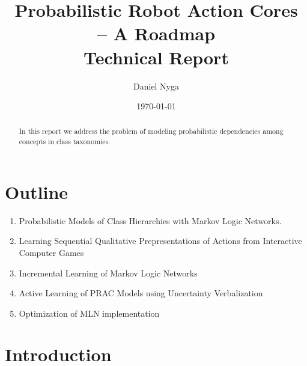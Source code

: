 \documentclass[12pt,a4paper]{article}
\title{\textbf{Probabilistic Robot Action Cores\\-- A Roadmap}\\\vspace{.5cm} {\Large Technical Report}}
\author{Daniel Nyga}
\date{\today}
\begin{document}
\maketitle	

\begin{abstract}
In this report we address the problem of modeling probabilistic dependencies among
concepts in class taxonomies. 
\end{abstract}

\section{Outline}

\begin{enumerate}
	\item Probabilistic Models of Class Hierarchies with Markov Logic Networks.
	\item Learning Sequential Qualitative Prepresentations of Actions from Interactive Computer Games
	\item Incremental Learning of Markov Logic Networks
	\item Active Learning of PRAC Models using Uncertainty Verbalization
	\item Optimization of MLN implementation
\end{enumerate}

\section{Introduction}
\end{document}
